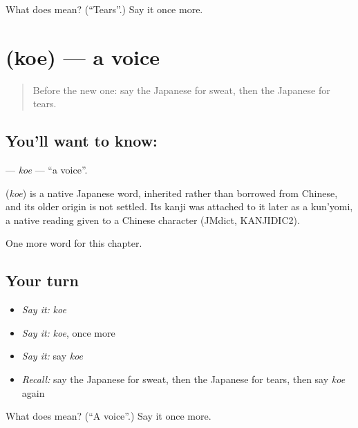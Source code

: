 \begin{tcolorbox}[breakable,colback=teal!4,colframe=teal!35!black,title={Before you move on}]
What does  mean? (\textquotedblleft{}Tears\textquotedblright{}.) Say it once more.
\end{tcolorbox}
\section[\texorpdfstring{\ja{こえ} (koe)}{こえ (koe)}]{ (koe) — a voice}

\label{lesson:JA-C22-koe}



\begin{quote}
Before the new one: say the Japanese for sweat, then the Japanese for tears.
\end{quote}

\subsection*{You'll want to know: }
\textbf{} — \emph{koe} — \textquotedblleft{}a voice\textquotedblright{}.

\begin{cousinweb}
\textbf{} (\emph{koe}) is a native Japanese word, inherited rather than borrowed from Chinese, and its older origin is not settled. Its kanji was attached to it later as a kun'yomi, a native reading given to a Chinese character (JMdict, KANJIDIC2).
\end{cousinweb}

\begin{grammarlens}[title={What you've built}]
One more word for this chapter.
\end{grammarlens}

\subsection*{Your turn}
\begin{itemize}
\raggedright
  \item \emph{Say it:} \emph{koe}
  \item \emph{Say it:} \emph{koe}, once more
  \item \emph{Say it:} say \emph{koe}
  \item \emph{Recall:} say the Japanese for sweat, then the Japanese for tears, then say \emph{koe} again
\end{itemize}

\begin{tcolorbox}[breakable,colback=teal!4,colframe=teal!35!black,title={Before you move on}]
What does  mean? (\textquotedblleft{}A voice\textquotedblright{}.) Say it once more.
\end{tcolorbox}
